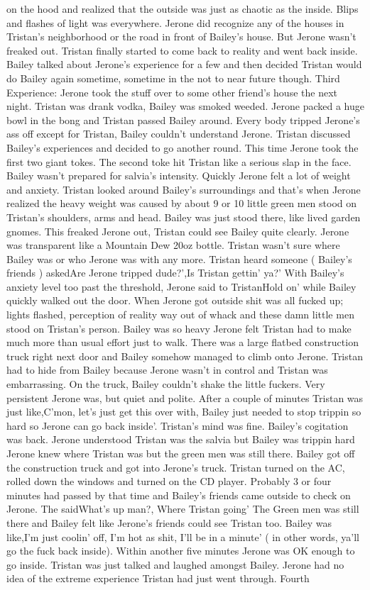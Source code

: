 \documentclass[12pt]{book}
\begin{document}
on the hood and realized that the outside was just as chaotic as the inside. Blips and flashes of light was everywhere. Jerone did recognize any of the houses in Tristan's neighborhood or the road in front of Bailey's house. But Jerone wasn't freaked out. Tristan finally started to come back to reality and went back inside. Bailey talked about Jerone's experience for a few and then decided Tristan would do Bailey again sometime, sometime in the not to near future though. Third Experience: Jerone took the stuff over to some other friend's house the next night. Tristan was drank vodka, Bailey was smoked weeded. Jerone packed a huge bowl in the bong and Tristan passed Bailey around. Every body tripped Jerone's ass off except for Tristan, Bailey couldn't understand Jerone. Tristan discussed Bailey's experiences and decided to go another round. This time Jerone took the first two giant tokes. The second toke hit Tristan like a serious slap in the face. Bailey wasn't prepared for salvia's intensity. Quickly Jerone felt a lot of weight and anxiety. Tristan looked around Bailey's surroundings and that's when Jerone realized the heavy weight was caused by about 9 or 10 little green men stood on Tristan's shoulders, arms and head. Bailey was just stood there, like lived garden gnomes. This freaked Jerone out, Tristan could see Bailey quite clearly. Jerone was transparent like a Mountain Dew 20oz bottle. Tristan wasn't sure where Bailey was or who Jerone was with any more. Tristan heard someone ( Bailey's friends ) askedAre Jerone tripped dude?',Is Tristan gettin' ya?' With Bailey's anxiety level too past the threshold, Jerone said to TristanHold on' while Bailey quickly walked out the door. When Jerone got outside shit was all fucked up; lights flashed, perception of reality way out of whack and these damn little men stood on Tristan's person. Bailey was so heavy Jerone felt Tristan had to make much more than usual effort just to walk. There was a large flatbed construction truck right next door and Bailey somehow managed to climb onto Jerone. Tristan had to hide from Bailey because Jerone wasn't in control and Tristan was embarrassing. On the truck, Bailey couldn't shake the little fuckers. Very persistent Jerone was, but quiet and polite. After a couple of minutes Tristan was just like,C'mon, let's just get this over with, Bailey just needed to stop trippin so hard so Jerone can go back inside'. Tristan's mind was fine. Bailey's cogitation was back. Jerone understood Tristan was the salvia but Bailey was trippin hard Jerone knew where Tristan was but the green men was still there. Bailey got off the construction truck and got into Jerone's truck. Tristan turned on the AC, rolled down the windows and turned on the CD player. Probably 3 or four minutes had passed by that time and Bailey's friends came outside to check on Jerone. The saidWhat's up man?, Where Tristan going' The Green men was still there and Bailey felt like Jerone's friends could see Tristan too. Bailey was like,I'm just coolin' off, I'm hot as shit, I'll be in a minute' ( in other words, ya'll go the fuck back inside). Within another five minutes Jerone was OK enough to go inside. Tristan was just talked and laughed amongst Bailey. Jerone had no idea of the extreme experience Tristan had just went through. Fourth 
\end{document}
